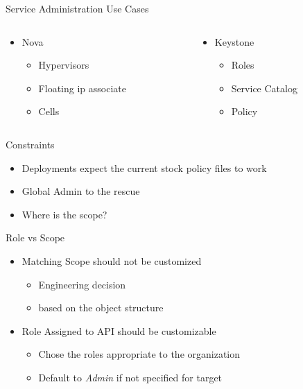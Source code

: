 \documentclass{beamer}
\begin{document}
\begin{frame}{Service Administration Use Cases}
  \begin{columns}[t,onlytextwidth]

    \begin{column}{.5\textwidth}
      \begin{itemize}
      \item Nova
        \begin{itemize}
        \item Hypervisors
        \item Floating ip associate
        \item Cells
        \end{itemize}
      \end{itemize}
    \end{column}

    \begin{column}{.5\textwidth}
      \begin{itemize}
      \item Keystone
        \begin{itemize}
        \item Roles
        \item Service Catalog 
        \item Policy
        \end{itemize}
      \end{itemize}
    \end{column}
  \end{columns}
\end{frame}




\begin{frame}{Constraints}
  \begin{itemize}
  \item  Deployments expect the current stock policy files to work
  \item Global Admin to the rescue
  \item Where is the scope?
  \end{itemize}
\end{frame}


\begin{frame}{Role vs Scope}
  \begin{itemize}
  \item Matching Scope should not be customized
    \begin{itemize}
    \item  Engineering decision
    \item  based on the object structure
    \end{itemize}
  \item Role Assigned to API should be customizable
    \begin{itemize}
    \item Chose the roles appropriate to the organization
    \item Default to \textit{Admin} if not specified for target
    \end{itemize}
  \end{itemize}
\end{frame}
  
\end{document}
